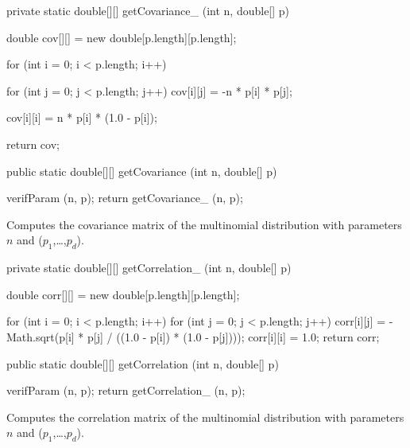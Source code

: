 \begin{code}\begin{hide}

   private static double[][] getCovariance_ (int n, double[] p) {
      double cov[][] = new double[p.length][p.length];

      for (int i = 0; i < p.length; i++) {
         for (int j = 0; j < p.length; j++)
            cov[i][j] = -n * p[i] * p[j];

         cov[i][i] = n * p[i] * (1.0 - p[i]);
      }
      return cov;
   }\end{hide}

   public static double[][] getCovariance (int n, double[] p)\begin{hide} {
      verifParam (n, p);
      return getCovariance_ (n, p);
   }\end{hide}
\end{code}
\begin{tabb}
   Computes the covariance matrix of the multinomial distribution
   with parameters $n$ and ($p_1$,\ldots,$p_d$).
\end{tabb}
\begin{code}\begin{hide}

   private static double[][] getCorrelation_ (int n, double[] p) {
      double corr[][] = new double[p.length][p.length];

      for (int i = 0; i < p.length; i++) {
         for (int j = 0; j < p.length; j++)
            corr[i][j] = -Math.sqrt(p[i] * p[j] / ((1.0 - p[i]) * (1.0 - p[j])));
         corr[i][i] = 1.0;
      }
      return corr;
   }\end{hide}

   public static double[][] getCorrelation (int n, double[] p)\begin{hide} {
      verifParam (n, p);
      return getCorrelation_ (n, p);
   }\end{hide}
\end{code}
\begin{tabb}
   Computes the correlation matrix of the multinomial distribution
   with parameters $n$ and ($p_1$,\ldots,$p_d$).
\end{tabb}
